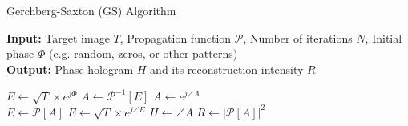 \begin{algorithm}[H]
  \caption{Gerchberg-Saxton (GS) Algorithm}\label{alg:Gerchberg-Saxton (GS) Algorithm}
  \textbf{Input:} Target image $T$, Propagation function $\mathcal{P}$, Number of iterations $N$, Initial phase $\varPhi$ (e.g. random, zeros, or other patterns) \\
  \textbf{Output:} Phase hologram $H$ and its reconstruction intensity $R$
  \begin{algorithmic}
    \State $E \gets \sqrt{T} \times e^{j\varPhi}$
    \State $A \gets \mathcal{P}^{-1}[E]$
    \State $A \gets e^{j\angle A}$\\
    \State $E \gets \mathcal{P}[A]$
    \State $E \gets \sqrt{T} \times e^{j\angle E}$
    \EndFor
    \State $H \gets \angle A$
    \State $R \gets \vert \mathcal{P}[A] \vert ^2$
  \end{algorithmic}
\end{algorithm}

